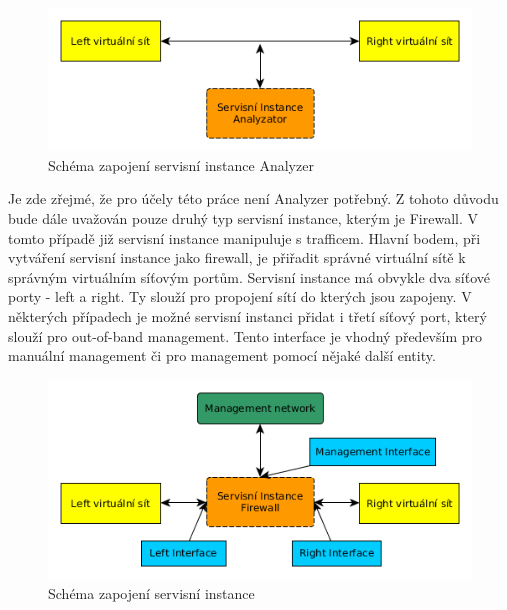 \begin{figure}[h]
\begin{centering}
\includegraphics[scale=0.63]{images/service_instance_anal}
\par\end{centering}
\caption{Schéma zapojení servisní instance Analyzer\label{fig:service_instance_anal}}
\end{figure}

Je zde zřejmé, že pro účely této práce není Analyzer potřebný. Z tohoto důvodu bude dále uvažován pouze druhý typ servisní instance, kterým je Firewall. V tomto případě již servisní instance manipuluje s trafficem. Hlavní bodem, při vytváření servisní instance jako firewall, je přiřadit správné virtuální sítě k správným virtuálním síťovým portům. Servisní instance má obvykle dva síťové porty - left a right. Ty slouží pro propojení sítí do kterých jsou zapojeny. V některých případech je možné servisní instanci přidat i třetí síťový port, který slouží pro out-of-band management. Tento interface je vhodný především pro manuální management či pro management pomocí nějaké další entity.

\begin{figure}[h]
\begin{centering}
\includegraphics[scale=0.63]{images/service_instance}
\par\end{centering}
\caption{Schéma zapojení servisní instance\label{fig:service_instance}}
\end{figure}

